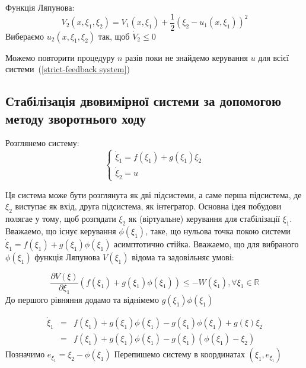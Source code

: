 \documentclass{article}
\begin{document}
Функція Ляпунова:
\begin{equation*}
    V_{2}(x,\xi_{1}, \xi_{2})=V_{1}(x,\xi_{1})+{\frac {1}{2}}(\xi_{2}-u_{1}(x,\xi_{1}))^{2}
\end{equation*}
Вибераємо $u_2(x,\xi_1, \xi_2)$ так, щоб $\dot V_{2} \le 0$

Можемо повторити процедуру $n$ разів поки не знайдемо керування $u$ для всієї системи~(\ref{strict-feedback system})

\pagebreak



\subsection{Стабілізація двовимірної системи за допомогою методу зворотнього ходу}
Розглянемо систему:
\begin{equation}
	\begin{cases}
		\dot \xi_1 = f(\xi_1) + g(\xi_1)\xi_2 \\
		\dot\xi_2 = u
	\end{cases}
\end{equation}

Ця система може бути розглянута як дві підсистеми, а саме перша підсистема, де $\xi_2$ виступає як вхід, друга
підсистема, як інтегратор. Основна ідея побудови полягае у тому, щоб розгядати $\xi_2$ як (віртуальне) керування для
стабілізації $\xi_1$. Вважаемо, що існує керування $\phi(\xi_1)$, таке, що нульова точка покою
системи $\dot \xi_1 = f(\xi_1) + g(\xi_1)\phi(\xi_1)$
асимптотично стійка.
Вважаемо, що для вибраного $\phi(\xi_1)$ функція Ляпунова $V(\xi_1)$  відома та задовільняє умові:

\begin{equation}
    \frac{\partial V(\xi)}{\partial \xi_1}(f(\xi_1)+g(\xi_1)\phi(\xi_1)) \leq
    -W(\xi_1), \forall \xi_1 \in \mathbb{R}
\end{equation}
До першого рівняння додамо та віднімемо $g(\xi_1)\phi(\xi_1)$

\begin{eqnarray}
\dot\xi_1 &=& f(\xi_1)+g(\xi_1)\phi(\xi_1)-g(\xi_1)\phi(\xi_1)+g(\xi)\xi_2\\
&=&f(\xi_1)+g(\xi_1)\phi(\xi_1)-g(\xi_1)(\phi(\xi_1)-\xi_2)
\end{eqnarray}
Позначимо $e_{\xi_1} = \xi_2-\phi(\xi_1)$
Перепишемо систему в координатах $(\xi_1, e_{\xi_1})$
\end{document}
